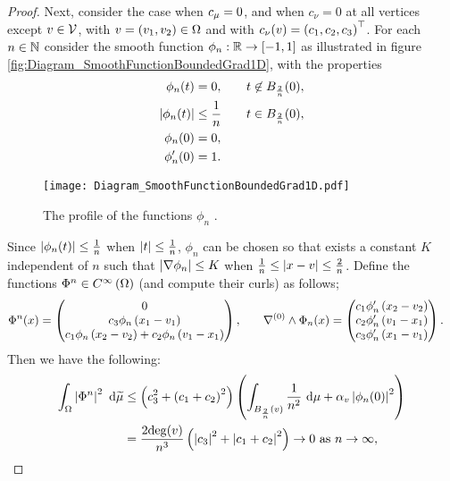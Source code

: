 \begin{proof}
	Next, consider the case when $c_{\mu}=0$, and when $c_{\nu}=0$ at all vertices except $v\in\mathcal{V}$, with $v=\left( v_1, v_2 \right)\in\Omega$ and with $c_{\nu}(v) = \left( c_1, c_2, c_3 \right)^\top$.
	For each $n\in\mathbb{N}$ consider the smooth function $\phi_n:\mathbb{R}\rightarrow\left[ -1,1 \right]$ as illustrated in figure \ref{fig:Diagram_SmoothFunctionBoundedGrad1D}, with the properties
	\begin{align*}
		\phi_n(t) &= 0, &\quad t\not\in B_{\frac{2}{n}}(0), \\
		\left\lvert \phi_n(t) \right\rvert &\leq \frac{1}{n} &\quad t\in B_{\frac{2}{n}}(0), \\
		\phi_n(0) &= 0, \\
		\phi'_n(0) &= 1.
	\end{align*}
	\begin{figure}[b]
		\centering
		\texttt{[image: Diagram\_SmoothFunctionBoundedGrad1D.pdf]}
		\caption{\label{fig:Diagram_SmoothFunctionBoundedGrad1DAltAxisLabels} The profile of the functions $\phi_n$ .}
	\end{figure}
	Since $\left\lvert \phi_n(t) \right\rvert \leq \frac{1}{n}$ when $\left\lvert t \right\rvert\leq\frac{1}{n}$, $\phi_n$ can be chosen so that exists a constant $K$ independent of $n$ such that $\left\lvert \nabla\phi_n \right\rvert \leq K$ when $\frac{1}{n} \leq \left\lvert x-v \right\rvert \leq \frac{2}{n}$.
	Define the functions $\Phi^n\in C^{\infty}\left( \Omega \right)$ (and compute their curls) as follows;
	\begin{align*}
		\Phi^n(x) = 
		\begin{pmatrix} 
			0 \\ 
			c_3\phi_n\left( x_1 - v_1 \right) \\ 
			c_1\phi_n\left( x_2-v_2 \right) + c_2\phi_n\left( v_1-x_1 \right) 
		\end{pmatrix},
		&\qquad
		\nabla^{(0)}\wedge\Phi_n(x) =
		\begin{pmatrix}
			c_1\phi'_n\left( x_2-v_2 \right) \\
			c_2\phi'_n\left( v_1-x_1 \right) \\
			c_3\phi'_n\left( x_1-v_1 \right)
		\end{pmatrix}.
	\end{align*}
	Then we have the following:
	\begin{align*}
		\integral{\ddom}{ \abs{ \Phi^n }^2 }{\dddmes}
		&\leq \bracs{c_3^2 + \bracs{c_1 + c_2}^2} \bracs{ \integral{B_{\frac{2}{n}}(v)}{ \recip{n^2} }{\ddmes}
		+ \alpha_v\abs{\phi_n(0)}^2 } \\
		&= \frac{2\mathrm{deg}(v)}{n^3}\bracs{\abs{c_3}^2 + \abs{c_1 + c_2}^2} \rightarrow 0 \toInfty{n}, \\

\end{align*}
\end{proof}
